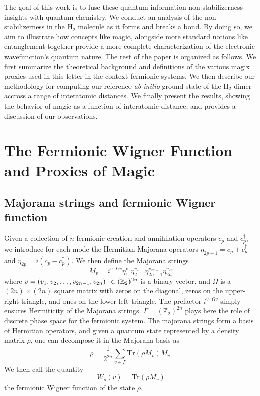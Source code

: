 \documentclass[aps,prl,twocolumn,groupedaddress, reprint,floatfix,nofootinbib,longbibliography]{revtex4-2}
\begin{document}
    The goal of this work is to fuse these quantum information non-stabilizerness insights with quantum chemistry. We conduct an analysis of the non-stabilizerness in the H$_2$ molecule as it forms and breaks a bond. By doing so, we aim to illustrate how concepts like magic, alongside more standard notions like entanglement together provide a more complete characterization of the electronic wavefunction’s quantum nature. The rest of the paper is organized as follows. We first summarize the theoretical background and definitions of the various magix proxies used in this letter in the context fermionic systems. We then describe our methodology for computing our reference \textit{ab initio} ground state of the H$_2$ dimer accross a range of interatomic distances. We finally present the results, showing the behavior of magic as a function of interatomic distance, and provides a discussion of our observations.

\section{The Fermionic Wigner Function and Proxies of Magic}

    \subsection{Majorana strings and fermionic Wigner function}

        Given a collection of $n$ fermionic creation and annihilation operators $c_p$ and $c_p^\dagger$, we introduce for each mode the Hermitian Majorana operators $\eta_{2p-1} = c_p + c_p^\dagger$ and $\eta_{2p} = i(c_p - c_p^\dagger)$. We then define the Majorana strings
        \begin{equation}
            M_v = i^{v\cdot \Omega v} \eta_{1}^{v_{1}}\eta_{2}^{v_{2}}\dots\eta_{2n-1}^{v_{2n-1}}\eta_{2n}^{v_{2n}}
        \end{equation}
        where $v = (v_1, v_2, \dots, v_{2n-1}, v_{2n})^\textsc{t} \in (\mathbb Z_2)^{2n}$ is a binary vector, and $\Omega$ is a $(2n)\times(2n)$ square matrix with zeros on the diagonal, zeros on the upper-right triangle, and ones on the lower-left triangle. The prefactor $i^{v\cdot \Omega v}$ simply ensures Hermiticity of the Majorana strings. $\Gamma=(\mathbb Z_2)^{2n}$ plays here the role of discrete phase space for the fermionic system. The majorana strings form a basis of Hermitian operators, and given a quantum state represented by a density matrix $\rho$, one can decompose it in the Majorana basis as
        \begin{equation}
            \rho = \frac{1}{2^{2n}}\sum_{v\in\Gamma}\text{Tr}(\rho M_v)M_v.
        \end{equation}
        We then call the quantity
        \begin{equation}
            W_\rho(v) = \text{Tr}(\rho M_v)
        \end{equation}
        the fermionic Wigner function of the state $\rho$.
\end{document}
